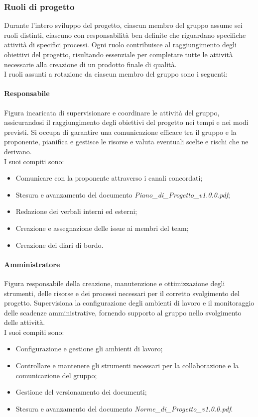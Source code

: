 \documentclass[10pt]{article}
\begin{document}
\begin{justify}
    \subsubsection{Ruoli di progetto}
    Durante l'intero sviluppo del progetto, ciascun membro del gruppo assume sei ruoli distinti, ciascuno con responsabilità ben definite che riguardano specifiche attività di specifici processi.
    Ogni ruolo contribuisce al raggiungimento degli obiettivi del progetto, risultando essenziale per completare tutte le attività necessarie alla creazione di un prodotto finale di qualità.\\
    I ruoli assunti a rotazione da ciascun membro del gruppo sono i seguenti:

        \paragraph{Responsabile}
        Figura incaricata di supervisionare e coordinare le attività del gruppo, assicurandosi il raggiungimento degli obiettivi del progetto nei tempi e nei modi previsti. Si occupa di garantire una comunicazione efficace tra il gruppo e la proponente, pianifica e gestisce le risorse e valuta eventuali scelte e rischi che ne derivano.\\
        I suoi compiti sono:
        \begin{itemize}
            \item Comunicare con la proponente attraverso i canali concordati;
            \item Stesura e avanzamento del documento \textit{Piano\_di\_Progetto\_v1.0.0.pdf};
            \item Redazione dei verbali interni ed esterni;
            \item Creazione e assegnazione delle issue ai membri del team;
            \item Creazione dei diari di bordo.
        \end{itemize}

        \paragraph{Amministratore}
        Figura responsabile della creazione, manutenzione e ottimizzazione degli strumenti, delle risorse e dei processi necessari per il corretto svolgimento del progetto. Supervisiona la configurazione degli ambienti di lavoro e il monitoraggio delle scadenze amministrative, fornendo supporto al gruppo nello svolgimento delle attività.\\
        I suoi compiti sono:
        \begin{itemize}
            \item Configurazione e gestione gli ambienti di lavoro;
            \item Controllare e mantenere gli strumenti necessari per la collaborazione e la comunicazione del gruppo;
            \item Gestione del versionamento dei documenti;
            \item Stesura e avanzamento del documento \textit{Norme\_di\_Progetto\_v1.0.0.pdf}.
        \end{itemize}


\end{justify}
\end{document}
